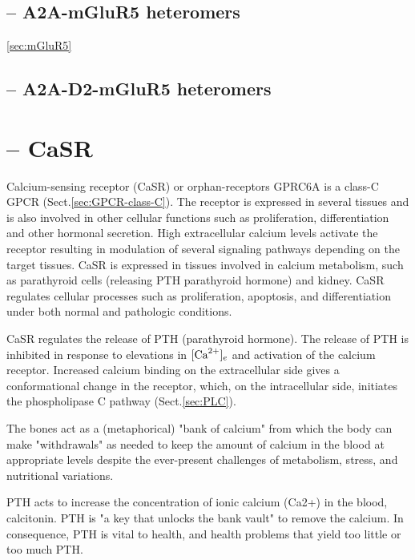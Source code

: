 \subsection{-- A2A-mGluR5 heteromers}
\label{sec:A2A-receptor-mGluR5-receptor-heteromer}

\ref{sec:mGluR5}

\subsection{-- A2A-D2-mGluR5 heteromers}
\label{sec:A2A-receptor-D2-receptor-mGluR5-heteromer}


\section{-- CaSR}
\label{sec:CaSR}

Calcium-sensing receptor (CaSR) or orphan-receptors GPRC6A is a class-C GPCR
(Sect.\ref{sec:GPCR-class-C}).
The receptor is expressed in several tissues and is also involved in other
cellular functions such as proliferation, differentiation and other hormonal
secretion. High extracellular calcium levels activate the receptor resulting in
modulation of several signaling pathways depending on the target tissues.
CaSR is expressed in tissues involved in calcium metabolism, such as parathyroid
cells (releasing PTH parathyroid hormone) and kidney. CaSR regulates cellular
processes such as proliferation, apoptosis, and differentiation under both
normal and pathologic conditions.

CaSR regulates the release of PTH (parathyroid hormone).
The release of PTH is inhibited in response to elevations in $[{\text{Ca}^{2+}}]_e$ and
activation of the calcium receptor. Increased calcium binding on the
extracellular side gives a conformational change in the receptor, which, on the
intracellular side, initiates the phospholipase C pathway (Sect.\ref{sec:PLC}).
  
\begin{mdframed}

The bones act as a (metaphorical) "bank of calcium" from which the body can make
"withdrawals" as needed to keep the amount of calcium in the blood at
appropriate levels despite the ever-present challenges of metabolism, stress,
and nutritional variations.   

PTH acts to increase the concentration of ionic calcium (Ca2+) in the blood,
calcitonin. PTH is "a key that unlocks the bank vault" to remove the calcium. In
consequence, PTH is vital to health, and health problems that yield too little
or too much PTH.
\end{mdframed}

